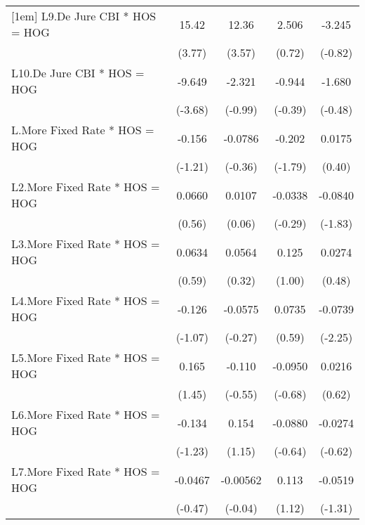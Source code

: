 {\begin{tabular}{l*{4}{c}}
[1em]
L9.De Jure CBI * HOS = HOG&    15.42\sym{***}&    12.36\sym{***}&    2.506         &   -3.245         \\
                &   (3.77)         &   (3.57)         &   (0.72)         &  (-0.82)         \\
[1em]
L10.De Jure CBI * HOS = HOG&   -9.649\sym{***}&   -2.321         &   -0.944         &   -1.680         \\
                &  (-3.68)         &  (-0.99)         &  (-0.39)         &  (-0.48)         \\
[1em]
L.More Fixed Rate * HOS = HOG&   -0.156         &  -0.0786         &   -0.202         &   0.0175         \\
                &  (-1.21)         &  (-0.36)         &  (-1.79)         &   (0.40)         \\
[1em]
L2.More Fixed Rate * HOS = HOG&   0.0660         &   0.0107         &  -0.0338         &  -0.0840         \\
                &   (0.56)         &   (0.06)         &  (-0.29)         &  (-1.83)         \\
[1em]
L3.More Fixed Rate * HOS = HOG&   0.0634         &   0.0564         &    0.125         &   0.0274         \\
                &   (0.59)         &   (0.32)         &   (1.00)         &   (0.48)         \\
[1em]
L4.More Fixed Rate * HOS = HOG&   -0.126         &  -0.0575         &   0.0735         &  -0.0739\sym{*}  \\
                &  (-1.07)         &  (-0.27)         &   (0.59)         &  (-2.25)         \\
[1em]
L5.More Fixed Rate * HOS = HOG&    0.165         &   -0.110         &  -0.0950         &   0.0216         \\
                &   (1.45)         &  (-0.55)         &  (-0.68)         &   (0.62)         \\
[1em]
L6.More Fixed Rate * HOS = HOG&   -0.134         &    0.154         &  -0.0880         &  -0.0274         \\
                &  (-1.23)         &   (1.15)         &  (-0.64)         &  (-0.62)         \\
[1em]
L7.More Fixed Rate * HOS = HOG&  -0.0467         & -0.00562         &    0.113         &  -0.0519         \\
                &  (-0.47)         &  (-0.04)         &   (1.12)         &  (-1.31)         \\

\end{tabular}}

